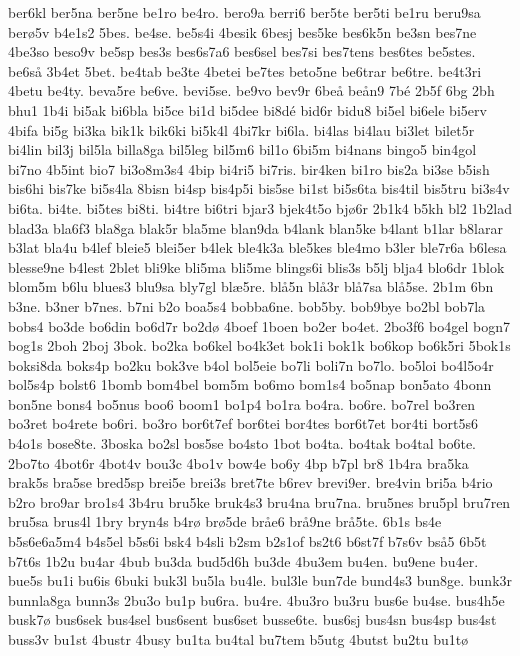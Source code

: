 ber6kl
ber5na
ber5ne
be1ro
be4ro.
bero9a
berri6
ber5te
ber5ti
be1ru
beru9sa
ber^^f85v
b4e1s2
5bes.
be4se.
be5s4i
4besik
6besj
bes5ke
bes6k5n
be3sn
bes7ne
4be3so
beso9v
be5sp
bes3s
bes6s7a6
bes6sel
bes7si
bes7tens
bes6tes
be5stes.
be6s^^e5
3b4et
5bet.
be4tab
be3te
4betei
be7tes
beto5ne
be6trar
be6tre.
be4t3ri
4betu
be4ty.
beva5re
be6ve.
bevi5se.
be9vo
bev9r
6be^^e5
be^^e5n9
7b^^e9
2b5f
6bg
2bh
bhu1
1b4i
bi5ak
bi6bla
bi5ce
bi1d
bi5dee
bi8d^^e9
bid6r
bidu8
bi5el
bi6ele
bi5erv
4bifa
bi5g
bi3ka
bik1k
bik6ki
bi5k4l
4bi7kr
bi6la.
bi4las
bi4lau
bi3let
bilet5r
bi4lin
bil3j
bil5la
billa8ga
bil5leg
bil5m6
bil1o
6bi5m
bi4nans
bingo5
bin4gol
bi7no
4b5int
bio7
bi3o8m3s4
4bip
bi4ri5
bi7ris.
bir4ken
bi1ro
bis2a
bi3se
b5ish
bis6hi
bis7ke
bi5s4la
8bisn
bi4sp
bis4p5i
bis5se
bi1st
bi5s6ta
bis4til
bis5tru
bi3s4v
bi6ta.
bi4te.
bi5tes
bi8ti.
bi4tre
bi6tri
bjar3
bjek4t5o
bj^^f86r
2b1k4
b5kh
bl2
1b2lad
blad3a
bla6f3
bla8ga
blak5r
bla5me
blan9da
b4lank
blan5ke
b4lant
b1lar
b8larar
b3lat
bla4u
b4lef
bleie5
blei5er
b4lek
ble4k3a
ble5kes
ble4mo
b3ler
ble7r6a
b6lesa
blesse9ne
b4lest
2blet
bli9ke
bli5ma
bli5me
blings6i
blis3s
b5lj
blja4
blo6dr
1blok
blom5m
b6lu
blues3
blu9sa
bly7gl
bl^^e65re.
bl^^e55n
bl^^e53r
bl^^e57sa
bl^^e55se.
2b1m
6bn
b3ne.
b3ner
b7nes.
b7ni
b2o
boa5s4
bobba6ne.
bob5by.
bob9bye
bo2bl
bob7la
bobs4
bo3de
bo6din
bo6d7r
bo2d^^f8
4boef
1boen
bo2er
bo4et.
2bo3f6
bo4gel
bogn7
bog1s
2boh
2boj
3bok.
bo2ka
bo6kel
bo4k3et
bok1i
bok1k
bo6kop
bo6k5ri
5bok1s
boksi8da
boks4p
bo2ku
bok3ve
b4ol
bol5eie
bo7li
boli7n
bo7lo.
bo5loi
bo4l5o4r
bol5s4p
bolst6
1bomb
bom4bel
bom5m
bo6mo
bom1s4
bo5nap
bon5ato
4bonn
bon5ne
bons4
bo5nus
boo6
boom1
bo1p4
bo1ra
bo4ra.
bo6re.
bo7rel
bo3ren
bo3ret
bo4rete
bo6ri.
bo3ro
bor6t7ef
bor6tei
bor4tes
bor6t7et
bor4ti
bort5s6
b4o1s
bose8te.
3boska
bo2sl
bos5se
bo4sto
1bot
bo4ta.
bo4tak
bo4tal
bo6te.
2bo7to
4bot6r
4bot4v
bou3c
4bo1v
bow4e
bo6y
4bp
b7pl
br8
1b4ra
bra5ka
brak5s
bra5se
bred5sp
brei5e
brei3s
bret7te
b6rev
brevi9er.
bre4vin
bri5a
b4rio
b2ro
bro9ar
bro1s4
3b4ru
bru5ke
bruk4s3
bru4na
bru7na.
bru5nes
bru5pl
bru7ren
bru5sa
brus4l
1bry
bryn4s
b4r^^f8
br^^f85de
br^^e5e6
br^^e59ne
br^^e55te.
6b1s
bs4e
b5s6e6a5m4
b4s5el
b5s6i
bsk4
b4sli
b2sm
b2s1of
bs2t6
b6st7f
b7s6v
bs^^e55
6b5t
b7t6s
1b2u
bu4ar
4bub
bu3da
bud5d6h
bu3de
4bu3em
bu4en.
bu9ene
bu4er.
bue5s
bu1i
bu6is
6buki
buk3l
bu5la
bu4le.
bul3le
bun7de
bund4s3
bun8ge.
bunk3r
bunnla8ga
bunn3s
2bu3o
bu1p
bu6ra.
bu4re.
4bu3ro
bu3ru
bus6e
bu4se.
bus4h5e
busk7^^f8
bus6sek
bus4sel
bus6sent
bus6set
busse6te.
bus6sj
bus4sn
bus4sp
bus4st
buss3v
bu1st
4bustr
4busy
bu1ta
bu4tal
bu7tem
b5utg
4butst
bu2tu
bu1t^^f8
